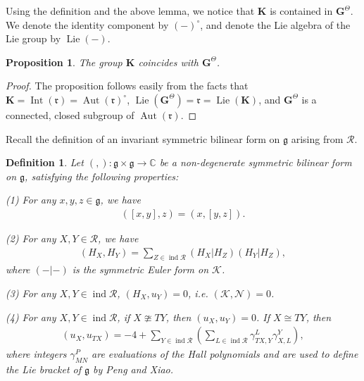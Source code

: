 \documentclass[10pt,a4paper]{amsart}
\newtheorem{definition}[theorem]{Definition}
\newtheorem{proposition}[theorem]{Proposition}
\begin{document}
Using the definition and the above lemma, we notice that $\mathbf{K}$ is contained in $\mathbf{G}^{\Theta}$.
We denote the identity component by $(-)^{\circ}$, and denote the Lie algebra of the Lie group by $\operatorname{Lie}(-)$.

\begin{proposition}
    The group $\mathbf{K}$ coincides with $\mathbf{G}^{\Theta}$.
\end{proposition}

\begin{proof}
    The proposition follows easily from the facts that $\mathbf{K}=\operatorname{Int}(\mathfrak{r})=\operatorname{Aut}(\mathfrak{r})^{\circ}$, $\operatorname{Lie}(\mathbf{G}^{\Theta})=\mathfrak{r}=\operatorname{Lie}(\mathbf{K})$, and $\mathbf{G}^{\Theta}$ is a connected, closed subgroup of $\operatorname{Aut}(\mathfrak{r})$.
\end{proof}

Recall the definition of an invariant symmetric bilinear form on $\mathfrak{g}$ arising from $\mathcal{R}$.

\begin{definition}\cite[Definition 29]{notes2}\label{(,)}
Let $(,):\mathfrak{g} \times \mathfrak{g} \rightarrow \mathbb{C}$ be a non-degenerate symmetric bilinear form on $\mathfrak{g}$, satisfying the following properties:

(1) For any $x,y,z\in \mathfrak{g}$, we have 
\begin{align*}
    ([x,y],z)=(x,[y,z]).
\end{align*}
    
(2) For any $X,Y\in \mathcal{R}$, we have 
\begin{align*}
    (H_X,H_Y)=\sum_{Z\in \operatorname{ind}\mathcal{R}}(H_X|H_Z)(H_Y|H_Z),
\end{align*}
where $(-|-)$ is the symmetric Euler form on $\mathcal{K}$.

(3) For any $X,Y\in \operatorname{ind}\mathcal{R}$, $(H_X,u_Y)=0$, i.e. $(\mathcal{K},\mathcal{N})=0$.

(4) For any $X,Y\in \operatorname{ind}\mathcal{R}$, if $X\ncong TY$, then $(u_X,u_Y)=0$. 
If $X\cong TY$, then 
\begin{align*}
    (u_X,u_{TX})= -4+\sum_{Y\in\operatorname{ind}\mathcal{R}}(\sum_{L\in\operatorname{ind}\mathcal{R}} \gamma_{TX,Y}^L\gamma_{X,L}^Y),
\end{align*}
where integers $\gamma_{MN}^P$ are evaluations of the Hall polynomials and are used to define the Lie bracket of $\mathfrak{g}$ by Peng and Xiao. 
\end{definition}
\end{document}
